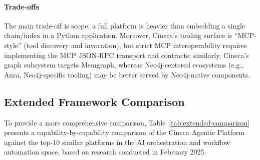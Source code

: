 \documentclass[a4paper,twoside]{sapthesis}
\begin{document}
\paragraph{Trade-offs}
The main trade-off is scope: a full platform is heavier than embedding a single chain/index in a Python application.
Moreover, Cineca's tooling surface is ``MCP-style'' (tool discovery and invocation), but strict MCP interoperability
requires implementing the MCP JSON-RPC transport and contracts; similarly, Cineca's graph subsystem targets Memgraph,
whereas Neo4j-centered ecosystems (e.g., Aura, Neo4j-specific tooling) may be better served by Neo4j-native components.

\subsection{Extended Framework Comparison}

To provide a more comprehensive comparison, Table~\ref{tab:extended-comparison} presents a capability-by-capability comparison of the Cineca Agentic Platform against the top-10 similar platforms in the AI orchestration and workflow automation space, based on research conducted in February 2025.
\end{document}
